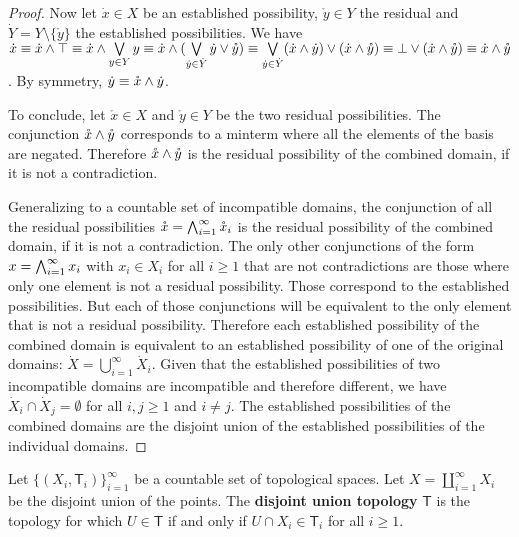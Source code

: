\documentclass[11pt,letterpaper,fleqn]{memoir} %
\begin{document}
\begin{mathSection}
\begin{proof}
		Now let $\dot{x} \in X$ be an established possibility, $\mathring{y} \in Y$ the residual and $\dot{Y} = Y \setminus \{\mathring{y}\}$ the established possibilities. We have $\dot{x} \equiv \dot{x} \wedge \top \equiv \dot{x} \wedge \bigvee\limits_{y \in Y} y \equiv \dot{x} \wedge (\bigvee\limits_{\dot{y} \in \dot{Y}} \dot{y} \vee \mathring{y}) \equiv \bigvee\limits_{\dot{y} \in \dot{Y}} (\dot{x} \wedge \dot{y}) \vee (\dot{x} \wedge \mathring{y}) \equiv \bot \vee (\dot{x} \wedge \mathring{y}) \equiv \dot{x} \wedge \mathring{y}$. By symmetry, $\dot{y} \equiv \mathring{x} \wedge \dot{y}$.
		
		To conclude, let $\mathring{x} \in X$ and $\mathring{y} \in Y$ be the two residual possibilities. The conjunction $\mathring{x} \wedge \mathring{y}$ corresponds to a minterm where all the elements of the basis are negated. Therefore $\mathring{x} \wedge \mathring{y}$ is the residual possibility of the combined domain, if it is not a contradiction. 
		
		Generalizing to a countable set of incompatible domains, the conjunction of all the residual possibilities $\mathring{x}= \bigwedge_{i=1}^{\infty} \mathring{x}_i$ is the residual possibility of the combined domain, if it is not a contradiction. The only other conjunctions of the form $x= \bigwedge_{i=1}^{\infty} x_i$ with $x_i \in X_i$ for all $i \geq 1$ that are not contradictions are those where only one element is not a residual possibility. Those correspond to the established possibilities. But each of those conjunctions will be equivalent to the only element that is not a residual possibility. Therefore each established possibility of the combined domain is equivalent to an established possibility of one of the original domains: $\dot{X} = \bigcup\limits_{i=1}^{\infty} \dot{X}_i$. Given that the established possibilities of two incompatible domains are incompatible and therefore different, we have $\dot{X}_i \cap \dot{X}_j = \emptyset$ for all $i,j \geq 1$ and $i \neq j$. The established possibilities of the combined domains are the disjoint union of the established possibilities of the individual domains.
	\end{proof}
	\begin{defn}
		Let $\{(X_i, \mathsf{T}_i)\}_{i=1}^{\infty}$ be a countable set of topological spaces. Let $X=\coprod\limits_{i=1}^{\infty} X_i$ be the disjoint union of the points. The \textbf{disjoint union topology} $\mathsf{T}$ is the topology for which $U \in \mathsf{T}$ if and only if $U \cap X_i \in \mathsf{T}_i$ for all $i \geq 1$.
	\end{defn}


\end{mathSection}
\end{document}
